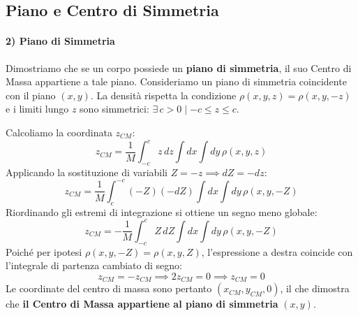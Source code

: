 \subsection{Piano e Centro di Simmetria}

\paragraph{2) Piano di Simmetria}
Dimostriamo che se un corpo possiede un \textbf{piano di simmetria}, il suo Centro di Massa appartiene a tale piano.
Consideriamo un piano di simmetria coincidente con il piano $(x,y)$. La densità rispetta la condizione $\rho(x,y,z) = \rho(x,y,-z)$ e i limiti lungo $z$ sono simmetrici: $\exists \, c > 0 \mid -c \le z \le c$.

Calcoliamo la coordinata $z_{CM}$:
\begin{equation}
    z_{CM} = \frac{1}{M} \int_{-c}^{c} z \, dz \int dx \int dy \, \rho(x,y,z)
\end{equation}
Applicando la sostituzione di variabili $Z = -z \implies dZ = -dz$:
\begin{equation}
    z_{CM} = \frac{1}{M} \int_{c}^{-c} (-Z) (-dZ) \int dx \int dy \, \rho(x,y,-Z)
\end{equation}
Riordinando gli estremi di integrazione si ottiene un segno meno globale:
\begin{equation}
    z_{CM} = - \frac{1}{M} \int_{-c}^{c} Z \, dZ \int dx \int dy \, \rho(x,y,-Z)
\end{equation}
Poiché per ipotesi $\rho(x,y,-Z) = \rho(x,y,Z)$, l'espressione a destra coincide con l'integrale di partenza cambiato di segno:
\begin{equation}
    z_{CM} = - z_{CM} \implies 2z_{CM} = 0 \implies z_{CM} = 0
\end{equation}
Le coordinate del centro di massa sono pertanto $(x_{CM}, y_{CM}, 0)$, il che dimostra che \textbf{il Centro di Massa appartiene al piano di simmetria} $(x,y)$.

